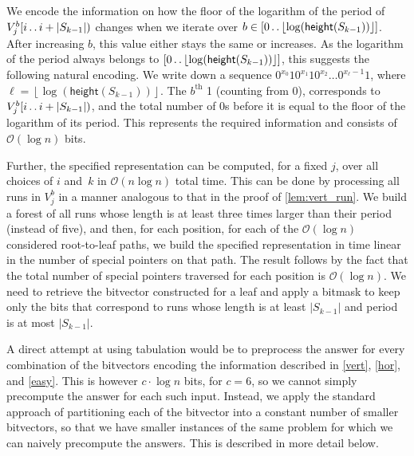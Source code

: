 \documentclass[11pt,letterpaper]{article}
\newcommand{\cO}{\mathcal{O}}
\newcommand{\floor}[1]{\left\lfloor #1 \right\rfloor}
\newcommand{\height}{\textsf{height}}
\def\dd{\mathinner{.\,.}}
\newcommand{\vmeta}[2]{V_{#1}^{#2}}
\begin{document}
We encode the information on how the floor of the logarithm of the period of  $\vmeta{j}{b}[i \dd i+|S_{k-1}|)$ changes
when we iterate over $b\in [0\dd \floor{\log (\height(S_{k-1}))}]$. After increasing $b$, this value either stays
the same or increases. As the logarithm of the period always belongs to $[0\dd \floor{\log (\height(S_{k-1}))}]$,
this suggests the following natural encoding. We write down a sequence $0^{x_{0}}1 0^{x_{1}}1 0^{x_{2}}\ldots 0^{x_{\ell}-1} 1$,
where $\ell = \floor{\log (\height(S_{k-1}))}$. The $b^{\text{th}}$ 1 (counting from 0), corresponds to 
$\vmeta{j}{b}[i \dd i+|S_{k-1}|)$, and the total number of 0s before it is equal to the floor of the logarithm of its period.
This represents the required information and consists of $\cO(\log n)$ bits.

Further, the specified representation can be computed, for a fixed $j$, over all choices of $i$ and~$k$ in $\cO(n \log n)$ total time.
This can be done by processing all runs in $\vmeta{j}{b}$ in a manner analogous to that in the proof of \cref{lem:vert_run}.
We build a forest of all runs whose length is at least three times larger than their period (instead of five), and then, for each position, for each of the $\cO(\log n)$ considered root-to-leaf paths, we build the specified representation in time linear in the number of special pointers on that path.
The result follows by the fact that the total number of special pointers traversed for each position is $\cO(\log n)$.
We need to retrieve the bitvector constructed for a leaf and apply a bitmask to keep only the bits that correspond to runs whose length is at least $|S_{k-1}|$ and period is at most $|S_{k-1}|$.

A direct attempt at using tabulation would be to preprocess the answer for every combination of the bitvectors
encoding the information described in \ref{vert}, \ref{hor}, and \ref{easy}. This is however $c\cdot \log n$ bits, for $c=6$, so we cannot
simply precompute the answer for each such input.
Instead, we apply the standard approach of partitioning each of the bitvector into a constant number of smaller bitvectors,
so that we have smaller instances of the same problem for which we can naively precompute the answers.
This is described in more detail below.
\end{document}
